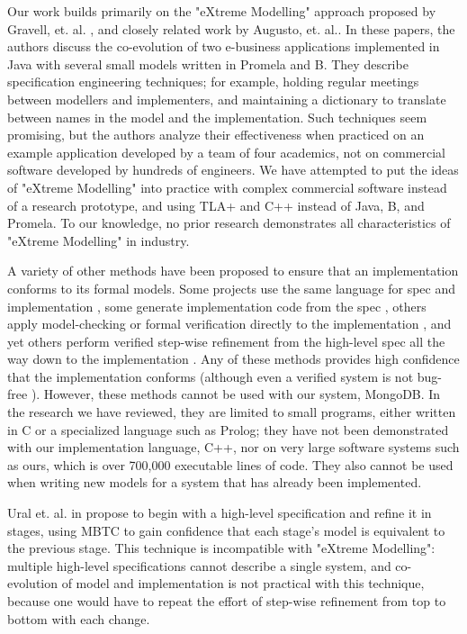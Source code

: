 \documentclass{vldb}
\begin{document}
Our work builds primarily on the "eXtreme Modelling" approach proposed by Gravell, et. al. \cite{Gravell11ConcurrentDevelopmentOfModelAndImplementation}, and closely related work by Augusto, et. al.\cite{Augusto03ValidatingBusinessSystems}. 
In these papers, the authors discuss the co-evolution of two e-business applications implemented in Java with several small models written in Promela and B.
They describe specification engineering techniques; for example, holding regular meetings between modellers and implementers, and maintaining a dictionary to translate between names in the model and the implementation.
Such techniques seem promising, but the authors analyze their effectiveness when practiced on an example application developed by a team of four academics, not on commercial software developed by hundreds of engineers.
We have attempted to put the ideas of "eXtreme Modelling" into practice with complex commercial software instead of a research prototype, and using TLA+ and C++ instead of Java, B, and Promela.
To our knowledge, no prior research demonstrates all characteristics of "eXtreme Modelling" in industry.

A variety of other methods have been proposed to ensure that an implementation conforms to its formal models.
Some projects use the same language for spec and implementation \cite{KerGre99}, some generate implementation code from the spec \cite{Houhou17CodeGenerationFromSpecification}, others apply model-checking or formal verification directly to the implementation \cite{Holzmann04ModelDrivenVerification, Chudnov18ContinuousFormalVerification}, and yet others perform verified step-wise refinement from the high-level spec all the way down to the implementation \cite{Eiriksson95UsingFormalVerification}.
Any of these methods provides high confidence that the implementation conforms (although even a verified system is not bug-free \cite{Fonseca17EmpiricalStudy}). 
However, these methods cannot be used with our system, MongoDB.
In the research we have reviewed, they are limited to small programs, either written in C or a specialized language such as Prolog; they have not been demonstrated with our implementation language, C++, nor on very large software systems such as ours, which is over 700,000 executable lines of code.
They also cannot be used when writing new models for a system that has already been implemented.

Ural et. al. in \cite{Ural84AutomatedTestingOfProtocolSpecifications} propose to begin with a high-level specification and refine it in stages, using MBTC to gain confidence that each stage's model is equivalent to the previous stage.
This technique is incompatible with "eXtreme Modelling": multiple high-level specifications cannot describe a single system, and co-evolution of model and implementation is not practical with this technique, because one would have to repeat the effort of step-wise refinement from top to bottom with each change.
\end{document}
